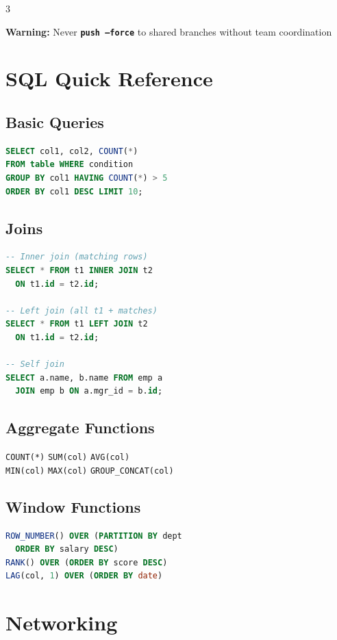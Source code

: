 \documentclass[7pt,landscape]{extarticle}
\newcommand{\code}[1]{\texttt{\fontsize{6pt}{7pt}\selectfont#1}}
\newcommand{\cmd}[1]{\textcolor{csPrimary}{\texttt{\textbf{\fontsize{6pt}{7pt}\selectfont#1}}}}
\begin{document}
\begin{multicols*}{3}
\begin{warnbox}
\textbf{Warning:} Never \cmd{push --force} to shared branches without team coordination
\end{warnbox}

\section*{SQL Quick Reference}

\subsection*{Basic Queries}
\begin{lstlisting}[language=SQL]
SELECT col1, col2, COUNT(*)
FROM table WHERE condition
GROUP BY col1 HAVING COUNT(*) > 5
ORDER BY col1 DESC LIMIT 10;
\end{lstlisting}

\subsection*{Joins}
\begin{lstlisting}[language=SQL]
-- Inner join (matching rows)
SELECT * FROM t1 INNER JOIN t2
  ON t1.id = t2.id;

-- Left join (all t1 + matches)
SELECT * FROM t1 LEFT JOIN t2
  ON t1.id = t2.id;

-- Self join
SELECT a.name, b.name FROM emp a
  JOIN emp b ON a.mgr_id = b.id;
\end{lstlisting}

\subsection*{Aggregate Functions}
\code{COUNT(*)} \hfill \code{SUM(col)} \hfill \code{AVG(col)} \\
\code{MIN(col)} \hfill \code{MAX(col)} \hfill \code{GROUP\_CONCAT(col)}

\subsection*{Window Functions}
\begin{lstlisting}[language=SQL]
ROW_NUMBER() OVER (PARTITION BY dept
  ORDER BY salary DESC)
RANK() OVER (ORDER BY score DESC)
LAG(col, 1) OVER (ORDER BY date)
\end{lstlisting}

\section*{Networking}


\end{multicols*}
\end{document}
